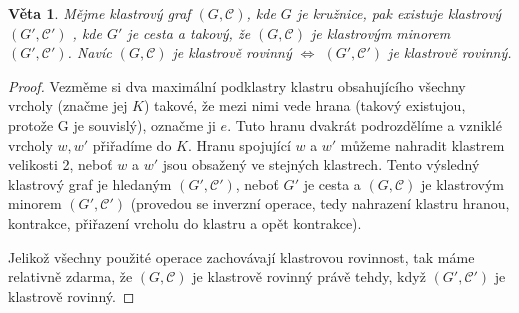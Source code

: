 \documentclass[12pt,a4report]{report}
\newtheorem{theorem}{Věta}[chapter]
\theoremstyle{definition}
\begin{document}
\begin{theorem}
Mějme klastrový graf $(G, \mathcal C)$, kde $G$ je kružnice, pak existuje klastrový $(G', \mathcal C')$ , kde $G'$ je cesta a takový, že $(G, \mathcal C)$ je klastrovým minorem $(G', \mathcal C')$. Navíc $(G, \mathcal C)$ je klastrově rovinný $\iff$ $(G', \mathcal C')$ je klastrově rovinný.
\end{theorem}
\begin{proof}
Vezměme si dva maximální podklastry klastru obsahujícího všechny vrcholy (značme jej $K$) takové, že mezi nimi vede hrana (takový existujou, protože G je souvislý), označme ji $e$. Tuto hranu dvakrát podrozdělíme a vzniklé vrcholy $w, w'$ přiřadíme do $K$. Hranu spojující $w$ a $w'$ můžeme nahradit klastrem velikosti 2, neboť $w$ a $w'$ jsou obsažený ve stejných klastrech. Tento výsledný klastrový graf je hledaným $(G', \mathcal C')$, neboť $G'$ je cesta a $(G, \mathcal C)$ je klastrovým minorem $(G', \mathcal C')$ (provedou se inverzní operace, tedy nahrazení klastru hranou, kontrakce, přiřazení vrcholu do klastru a opět kontrakce).

Jelikož všechny použité operace zachovávají klastrovou rovinnost, tak máme relativně zdarma, že $(G, \mathcal C)$ je klastrově rovinný právě tehdy, když $(G', \mathcal C')$ je klastrově rovinný.
\end{proof}
\end{document}
